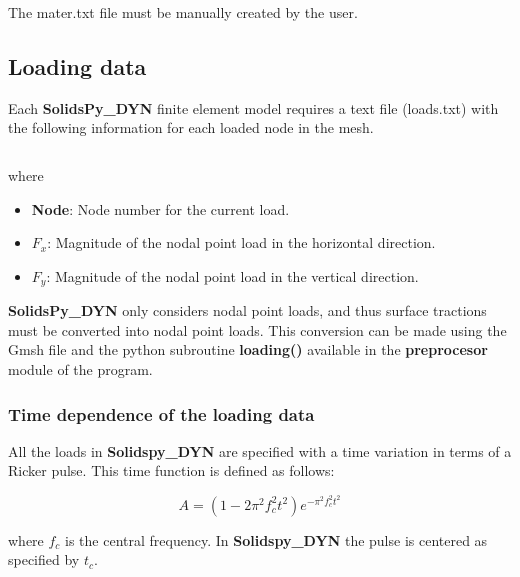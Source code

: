 \documentclass[11pt,letterpaper]{article}
\begin{document}
The mater.txt file must be manually created by the user.

\subsection{Loading data}
Each {\bf SolidsPy\_DYN} finite element model requires a text file (loads.txt) with the following information for each loaded node in the mesh.
\inputminted[mathescape,
               numbersep=5pt,
               gobble=0,
               frame=lines,
               framesep=2mm]{c}{loadsT.txt}
               
where

\begin{itemize}

\item {\bf Node}: Node number for the current load.
\item {\bf $F_x$}: Magnitude of the nodal point load in the horizontal direction.
\item {\bf $F_y$}: Magnitude of the nodal point load in the vertical direction.

\end{itemize}

{\bf SolidsPy\_DYN} only considers nodal point loads, and thus surface tractions must be converted into nodal point loads. This conversion can be made using the Gmsh file and the python subroutine {\bf loading()} available in the {\bf preprocesor} module of the program.


\subsubsection{Time dependence of the loading data}

All the loads in {\bf Solidspy\_DYN} are specified with a time variation in terms of a Ricker pulse. This time function is defined as follows:
 
 \[A = \left( {1 - 2{\pi ^2}f_c^2{t^2}} \right){e^{ - {\pi ^2}f_c^2{t^2}}}\]
 
 where $f_c$ is the central frequency. In {\bf Solidspy\_DYN} the pulse is centered as specified by $t_c$.
 
\end{document}
